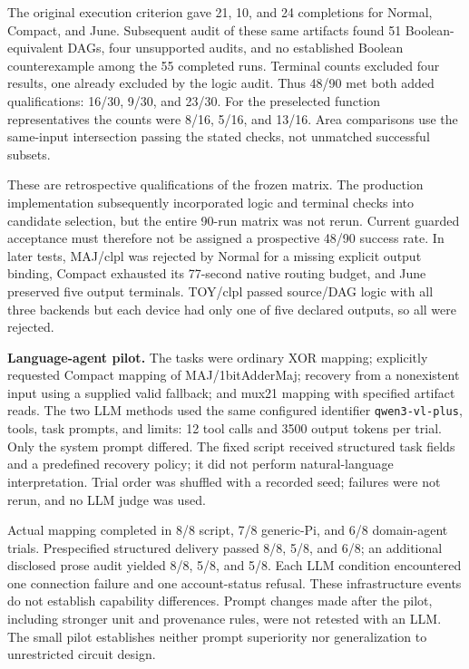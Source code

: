 \documentclass[11pt,a4paper]{article}
\begin{document}
The original execution criterion gave 21, 10, and 24 completions for Normal, Compact, and June. Subsequent audit of these same artifacts found 51 Boolean-equivalent DAGs, four unsupported audits, and no established Boolean counterexample among the 55 completed runs. Terminal counts excluded four results, one already excluded by the logic audit. Thus 48/90 met both added qualifications: 16/30, 9/30, and 23/30. For the preselected function representatives the counts were 8/16, 5/16, and 13/16. Area comparisons use the same-input intersection passing the stated checks, not unmatched successful subsets.

These are retrospective qualifications of the frozen matrix. The production implementation subsequently incorporated logic and terminal checks into candidate selection, but the entire 90-run matrix was not rerun. Current guarded acceptance must therefore not be assigned a prospective 48/90 success rate. In later tests, MAJ/clpl was rejected by Normal for a missing explicit output binding, Compact exhausted its 77-second native routing budget, and June preserved five output terminals. TOY/clpl passed source/DAG logic with all three backends but each device had only one of five declared outputs, so all were rejected.

\textbf{Language-agent pilot.} The tasks were ordinary XOR mapping; explicitly requested Compact mapping of MAJ/1bitAdderMaj; recovery from a nonexistent input using a supplied valid fallback; and mux21 mapping with specified artifact reads. The two LLM methods used the same configured identifier \texttt{qwen3-vl-plus}, tools, task prompts, and limits: 12 tool calls and 3500 output tokens per trial. Only the system prompt differed. The fixed script received structured task fields and a predefined recovery policy; it did not perform natural-language interpretation. Trial order was shuffled with a recorded seed; failures were not rerun, and no LLM judge was used.

Actual mapping completed in 8/8 script, 7/8 generic-Pi, and 6/8 domain-agent trials. Prespecified structured delivery passed 8/8, 5/8, and 6/8; an additional disclosed prose audit yielded 8/8, 5/8, and 5/8. Each LLM condition encountered one connection failure and one account-status refusal. These infrastructure events do not establish capability differences. Prompt changes made after the pilot, including stronger unit and provenance rules, were not retested with an LLM. The small pilot establishes neither prompt superiority nor generalization to unrestricted circuit design.
\end{document}
